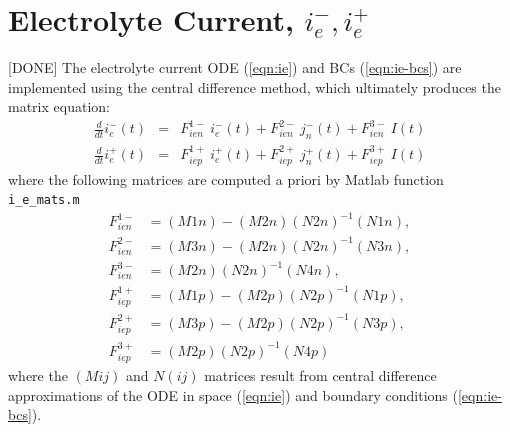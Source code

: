 \documentclass[12pt]{article}
\newcommand{\green}[1]{{\color{green}#1}}
\begin{document}
\section{Electrolyte Current, $i_{e}^{-}, i_{e}^{+}$}\label{sec:ie}
\green{[DONE]} The electrolyte current ODE (\ref{eqn:ie}) and BCs (\ref{eqn:ie-bcs}) are implemented using the central difference method, which ultimately produces the matrix equation:
\begin{eqnarray}
	\frac{d}{dt} i_{e}^{-}(t) &=& F^{1-}_{ien} \ i_{e}^{-}(t) + F^{2-}_{ien} \ j_{n}^{-}(t) + F^{3-}_{ien} \ I(t) \\
	\frac{d}{dt} i_{e}^{+}(t) &=& F^{1+}_{iep} \ i_{e}^{+}(t) + F^{2+}_{iep} \ j_{n}^{+}(t) + F^{3+}_{iep} \ I(t)
\end{eqnarray}
where the following matrices are computed a priori by Matlab function \texttt{i\_e\_mats.m}
\begin{align}
	F^{1-}_{ien} &= (M1n) - (M2n) (N2n)^{-1} (N1n), \\
	F^{2-}_{ien} &= (M3n) - (M2n) (N2n)^{-1} (N3n), \\
	F^{3-}_{ien} &= (M2n) (N2n)^{-1} (N4n), \\
	F^{1+}_{iep} &= (M1p) - (M2p) (N2p)^{-1} (N1p), \\
	F^{2+}_{iep} &= (M3p) - (M2p) (N2p)^{-1} (N3p), \\
	F^{3+}_{iep} &= (M2p) (N2p)^{-1} (N4p)
\end{align}
where the $(Mij)$ and $N(ij)$ matrices result from central difference approximations of the ODE in space (\ref{eqn:ie}) and boundary conditions (\ref{eqn:ie-bcs}).
\end{document}
